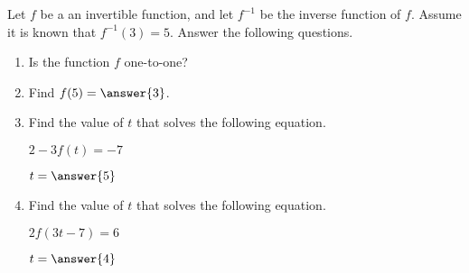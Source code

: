 \documentclass{ximera}
\author{Elizabeth Miller}
\begin{document}
Let $f$ be a an invertible function, and let $f^{-1}$ be the inverse function of $f$.  Assume it is known that $f^{-1}(3)=5$.  Answer the following questions.

\begin{exercise}
\begin{enumerate}
\item Is the function $f$ one-to-one?
\begin{multipleChoice}
\end{multipleChoice}

\item  Find $f(5)=\answer{3}$.

\item Find the value of $t$ that solves the following equation.

$2-3f(t)=-7$

$t=\answer{5}$

\item Find the value of $t$ that solves the following equation.

$2f(3t-7)=6$

$t=\answer{4}$

\end{enumerate}

\end{exercise}
\end{document}
